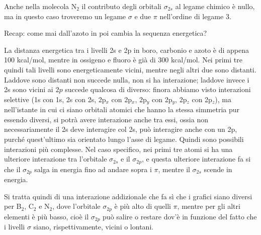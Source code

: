 \vspace{0.2cm}Anche nella molecola N$_2$ il contributo degli orbitali $\sigma_{2s}$ al legame chimico è nullo, ma in questo caso troveremo un legame $\sigma$ e due $\pi$ nell'ordine di legame 3.

\vspace{0.2cm}Recap: come mai dall'azoto in poi cambia la sequenza energetica?

La distanza energetica tra i livelli 2s e 2p in boro, carbonio e azoto è di appena 100 kcal/mol, mentre in ossigeno e fluoro è già di 300 kcal/mol. Nei primi tre quindi tali livelli sono energeticamente vicini, mentre negli altri due sono distanti. Laddove sono distanti non succede nulla, non si ha interazione; laddove invece i 2s sono vicini ai $2p$ succede qualcosa di diverso: finora abbiamo visto interazioni selettive (1s con 1s, 2s con 2s, 2p$_x$ con 2p$_x$, 2p$_y$ con 2p$_y$, 2p$_z$ con 2p$_z$), ma nell'istante in cui ci siano orbitali atomici che hanno la stessa simmetria pur essendo diversi, si potrà avere interazione anche tra essi, ossia non necessariamente il 2s deve interagire col 2s, può interagire anche con un 2p, purché quest'ultimo sia orientato lungo l'asse di legame. Quindi sono possibili interazioni più complesse. Nel caso specifico, nei primi tre atomi si ha una ulteriore interazione tra l'orbitale $\sigma_{2s}$ e il $\sigma_{2p}$, e questa ulteriore interazione fa si che il $\sigma_{2p}$ salga in energia fino ad andare sopra i $\pi$, mentre il $\sigma_{2s}$ scende in energia.

Si tratta quindi di una interazione addizionale che fa sì che i grafici siano diversi per B$_2$, C$_2$ e N$_2$, dove l'orbitale $\sigma_{2p}$ è più alto di quelli $\pi$, mentre per gli altri elementi è più basso, cioè il $\sigma_{2p}$ può salire o restare dov'è in funzione del fatto che i livelli $\sigma$ siano, rispettivamente, vicini o lontani.

